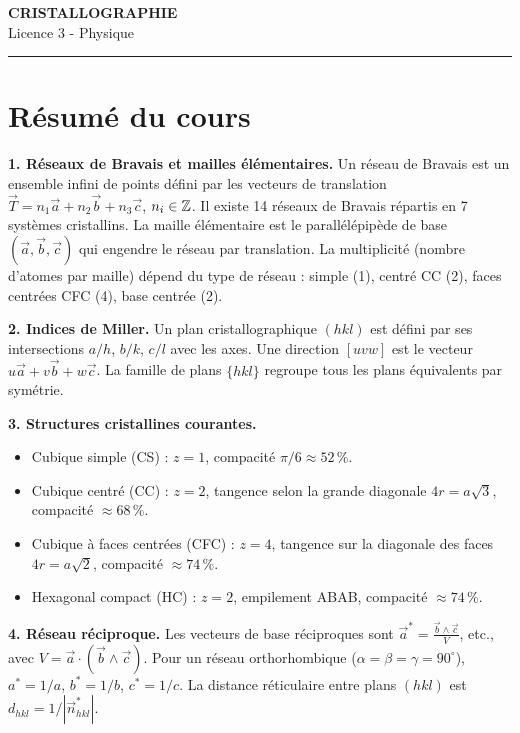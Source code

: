 \documentclass[12pt,a4paper]{article}
\begin{document}
\fi

\begin{center}
  {\LARGE\bfseries CRISTALLOGRAPHIE}\\[0.3cm]
  {\normalsize Licence 3 - Physique}\\[0.1cm]
  \rule{0.7\textwidth}{0.8pt}
\end{center}

\section*{Résumé du cours}

\begin{boiteresume}

\textbf{1. Réseaux de Bravais et mailles élémentaires.}
Un réseau de Bravais est un ensemble infini de points défini par les vecteurs de translation $\vec{T} = n_1\vec{a}+n_2\vec{b}+n_3\vec{c}$, $n_i\in\mathbb{Z}$. Il existe 14 réseaux de Bravais répartis en 7 systèmes cristallins. La maille élémentaire est le parallélépipède de base $(\vec{a},\vec{b},\vec{c})$ qui engendre le réseau par translation. La multiplicité (nombre d'atomes par maille) dépend du type de réseau : simple (1), centré CC (2), faces centrées CFC (4), base centrée (2).

\textbf{2. Indices de Miller.}
Un plan cristallographique $(hkl)$ est défini par ses intersections $a/h$, $b/k$, $c/l$ avec les axes. Une direction $[uvw]$ est le vecteur $u\vec{a}+v\vec{b}+w\vec{c}$. La famille de plans $\{hkl\}$ regroupe tous les plans équivalents par symétrie.

\textbf{3. Structures cristallines courantes.}
\begin{itemize}[nosep]
  \item Cubique simple (CS) : $z=1$, compacité $\pi/6 \approx 52\,\%$.
  \item Cubique centré (CC) : $z=2$, tangence selon la grande diagonale $4r=a\sqrt{3}$, compacité $\approx 68\,\%$.
  \item Cubique à faces centrées (CFC) : $z=4$, tangence sur la diagonale des faces $4r=a\sqrt{2}$, compacité $\approx 74\,\%$.
  \item Hexagonal compact (HC) : $z=2$, empilement ABAB, compacité $\approx 74\,\%$.
\end{itemize}

\textbf{4. Réseau réciproque.}
Les vecteurs de base réciproques sont $\vec{a}^* = \tfrac{\vec{b}\wedge\vec{c}}{V}$, etc., avec $V = \vec{a}\cdot(\vec{b}\wedge\vec{c})$. Pour un réseau orthorhombique ($\alpha=\beta=\gamma=90^\circ$), $a^*=1/a$, $b^*=1/b$, $c^*=1/c$. La distance réticulaire entre plans $(hkl)$ est $d_{hkl} = 1/|\vec{n}_{hkl}^*|$.


\end{boiteresume}
\end{document}
